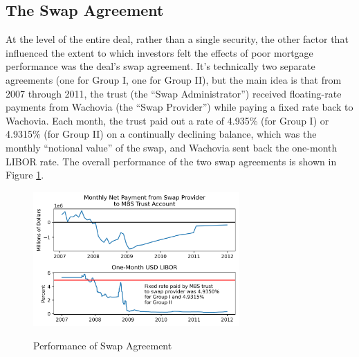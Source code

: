 \documentclass[12pt]{article}
\begin{document}
\subsection*{The Swap Agreement}

At the level of the entire deal, rather than a single security, the other factor that influenced the extent to which investors felt the effects of poor mortgage performance was the deal’s swap agreement. It’s technically two separate agreements (one for Group I, one for Group II), but the main idea is that from 2007 through 2011, the trust (the “Swap Administrator”) received floating-rate payments from Wachovia (the “Swap Provider”) while paying a fixed rate back to Wachovia. Each month, the trust paid out a rate of 4.935\% (for Group I) or 4.9315\% (for Group II) on a continually declining balance, which was the monthly “notional value” of the swap, and Wachovia sent back the one-month LIBOR rate. The overall performance of the two swap agreements is shown in Figure \ref{fig:timeseries_swap_performance}.

\begin{figure}[h]
	\centering
	\caption{Performance of Swap Agreement}
	\includegraphics[width=0.7\textwidth]{../figures/timeseries_swap_performance}
	\label{fig:timeseries_swap_performance}
\end{figure}
\end{document}
